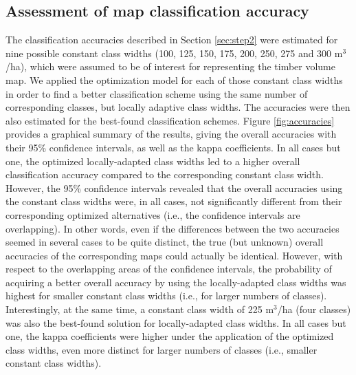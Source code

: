 \subsection{Assessment of map classification accuracy}
\label{sec:mapacc}

The classification accuracies described in Section \ref{sec:step2} were estimated for nine possible constant class widths (100, 125, 150, 175, 200, 250, 275 and 300 m$^3$/ha), which were assumed to be of interest for representing the timber volume map. We applied the optimization model for each of those constant class widths in order to find a better classification scheme using the same number of corresponding classes, but locally adaptive class widths. The accuracies were then also estimated for the best-found classification schemes. Figure \ref{fig:accuracies} provides a graphical summary of the results, giving the overall accuracies with their 95\% confidence intervals, as well as the kappa coefficients. In all cases but one, the optimized locally-adapted class widths led to a higher overall classification accuracy compared to the corresponding constant class width. However, the 95\% confidence intervals revealed that the overall accuracies using the constant class widths were, in all cases, not significantly different from their corresponding optimized alternatives (i.e., the confidence intervals are overlapping). In other words, even if the differences between the two accuracies seemed in several cases to be quite distinct, the true (but unknown) overall accuracies of the corresponding maps could actually be identical. However, with respect to the overlapping areas of the confidence intervals, the probability of acquiring a better overall accuracy by using the locally-adapted class widths was highest for smaller constant class widths (i.e., for larger numbers of classes). Interestingly, at the same time, a constant class width of 225 m$^3$/ha (four classes) was also the best-found solution for locally-adapted class widths. In all cases but one, the kappa coefficients were higher under the application of the optimized class widths, even more distinct for larger numbers of classes (i.e., smaller constant class widths).

